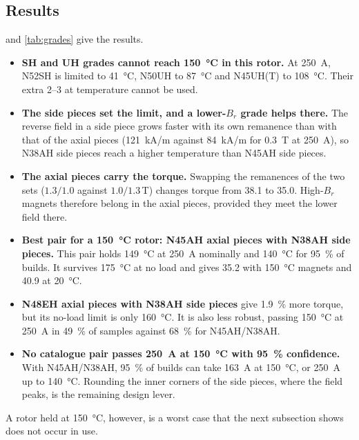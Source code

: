 

\subsection{Results}
 and \cref{tab:grades} give the results.
\begin{itemize}
\item \textbf{SH and UH grades cannot reach \SI{150}{\celsius} in this rotor.} At \SI{250}{A}, N52SH is limited to \SI{41}{\celsius}, N50UH to \SI{87}{\celsius} and N45UH(T) to \SI{108}{\celsius}. Their extra \SIrange{2}{3}{\Nm} at temperature cannot be used.
\item \textbf{The side pieces set the limit, and a lower-$B_r$ grade helps there.} The reverse field in a side piece grows faster with its own remanence than with that of the axial pieces (\SI{+121}{kA/m} against \SI{+84}{kA/m} for \SI{+0.3}{T} at \SI{250}{A}), so N38AH side pieces reach a higher temperature than N45AH side pieces.
\item \textbf{The axial pieces carry the torque.} Swapping the remanences of the two sets ($1.3/1.0$ against $1.0/1.3$\,T) changes torque from \SI{38.1}{\Nm} to \SI{35.0}{\Nm}. High-$B_r$ magnets therefore belong in the axial pieces, provided they meet the lower field there.
\item \textbf{Best pair for a \SI{150}{\celsius} rotor: N45AH axial pieces with N38AH side pieces.} This pair holds \SI{149}{\celsius} at \SI{250}{A} nominally and \SI{140}{\celsius} for \SI{95}{\percent} of builds. It survives \SI{175}{\celsius} at no load and gives \SI{35.2}{\Nm} with \SI{150}{\celsius} magnets and \SI{40.9}{\Nm} at \SI{20}{\celsius}.
\item \textbf{N48EH axial pieces with N38AH side pieces} give \SI{1.9}{\percent} more torque, but its no-load limit is only \SI{160}{\celsius}. It is also less robust, passing \SI{150}{\celsius} at \SI{250}{A} in \SI{49}{\percent} of samples against \SI{68}{\percent} for N45AH/N38AH.
\item \textbf{No catalogue pair passes \SI{250}{A} at \SI{150}{\celsius} with \SI{95}{\percent} confidence.} With N45AH/N38AH, \SI{95}{\percent} of builds can take \SI{163}{A} at \SI{150}{\celsius}, or \SI{250}{A} up to \SI{140}{\celsius}. Rounding the inner corners of the side pieces, where the field peaks, is the remaining design lever.
\end{itemize}

A rotor held at \SI{150}{\celsius}, however, is a worst case that the next subsection shows does not occur in use.

